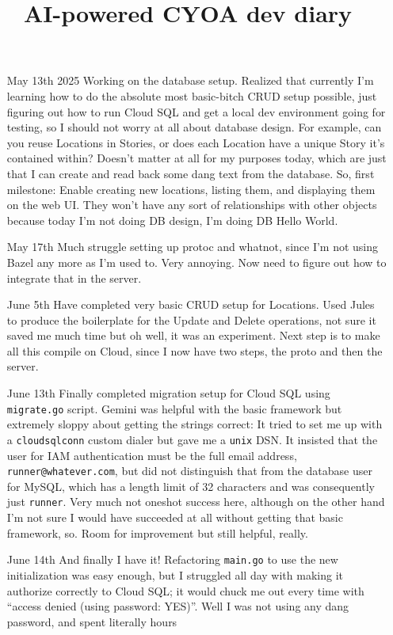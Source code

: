 \documentclass[12pt]{article}
\title{AI-powered CYOA dev diary}
\begin{document}
\begin{itemize}
\item[May 13th 2025] Working on the database setup. Realized that
  currently I'm learning how to do the absolute most basic-bitch CRUD
  setup possible, just figuring out how to run Cloud SQL and get a
  local dev environment going for testing, so I should not worry at
  all about database design. For example, can you reuse Locations in
  Stories, or does each Location have a unique Story it's contained
  within? Doesn't matter at all for my purposes today, which are just
  that I can create and read back some dang text from the
  database. So, first milestone: Enable creating new locations,
  listing them, and displaying them on the web UI. They won't have any
  sort of relationships with other objects because today I'm not doing
  DB design, I'm doing DB Hello World.
\item[May 17th] Much struggle setting up protoc and whatnot, since I'm
  not using Bazel any more as I'm used to. Very annoying. Now need to
  figure out how to integrate that in the server.
\item[June 5th] Have completed very basic CRUD setup for
  Locations. Used Jules to produce the boilerplate for the Update and
  Delete operations, not sure it saved me much time but oh well, it
  was an experiment. Next step is to make all this compile on Cloud,
  since I now have two steps, the proto and then the server.
\item[June 13th] Finally completed migration setup for Cloud SQL using
  \verb|migrate.go| script. Gemini was helpful with the basic
  framework but extremely sloppy about getting the strings correct: It
  tried to set me up with a \verb|cloudsqlconn| custom dialer but gave
  me a \verb|unix| DSN. It insisted that the user for IAM
  authentication must be the full email address,
  \verb|runner@whatever.com|, but did not distinguish that from the
  database user for MySQL, which has a length limit of 32 characters
  and was consequently just \verb|runner|. Very much not oneshot
  success here, although on the other hand I'm not sure I would have
  succeeded at all without getting that basic framework, so. Room for
  improvement but still helpful, really.
\item[June 14th] And finally I have it! Refactoring \verb|main.go| to
  use the new initialization was easy enough, but I struggled all day
  with making it authorize correctly to Cloud SQL; it would chuck me
  out every time with ``access denied (using password: YES)''. Well I
  was not using any dang password, and spent literally hours

\end{itemize}
\end{document}
